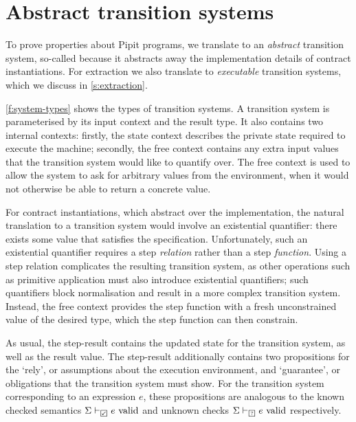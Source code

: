 
\section{Abstract transition systems}
\label{s:transition}


To prove properties about Pipit programs, we translate to an \emph{abstract} transition system, so-called because it abstracts away the implementation details of contract instantiations.
For extraction we also translate to \emph{executable} transition systems, which we discuss in \autoref{s:extraction}.

\autoref{f:system-types} shows the types of transition systems.
A transition system is parameterised by its input context and the result type.
It also contains two internal contexts: firstly, the state context describes the private state required to execute the machine; secondly, the free context contains any extra input values that the transition system would like to quantify over.
The free context is used to allow the system to ask for arbitrary values from the environment, when it would not otherwise be able to return a concrete value.

For contract instantiations, which abstract over the implementation, the natural translation to a transition system would involve an existential quantifier: there exists some value that satisfies the specification.
Unfortunately, such an existential quantifier requires a step \emph{relation} rather than a step \emph{function}.
Using a step relation complicates the resulting transition system, as other operations such as primitive application must also introduce existential quantifiers; such quantifiers block normalisation and result in a more complex transition system.
Instead, the free context provides the step function with a fresh unconstrained value of the desired type, which the step function can then constrain.

As usual, the step-result contains the updated state for the transition system, as well as the result value.
The step-result additionally contains two propositions for the `rely', or assumptions about the execution environment, and `guarantee', or obligations that the transition system must show.
For the transition system corresponding to an expression $e$, these propositions are analogous to the known checked semantics $\semcheck{\Sigma}{\PSValid}{e}$ and unknown checks $\semcheck{\Sigma}{\PSUnknown}{e}$ respectively.

